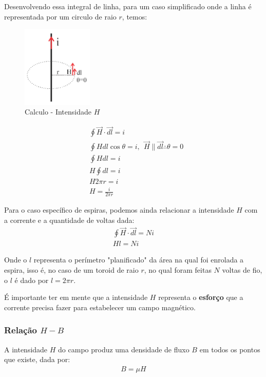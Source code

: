 \documentclass{article}
\newcommand{\n}{\nonumber \\ }
\begin{document}
Desenvolvendo essa integral de linha, para um caso simplificado onde a linha é representada por um circulo de raio $r$, temos:

\begin{figure}
    \centering
    \includegraphics[width=0.3\textwidth]{imgs/2023-08-15 11_04_26-1_CIRCUITOS_MAG.pdf - ET520 - Princípios de Conversão de Energia - Visual Studio.png}
    \caption{Calculo - Intensidade $H$}
\end{figure}

\begin{align}
    &\oint \vec H \cdot \vec{dl} = i \n
    &\oint  H dl \cos \theta = i , \ \  \vec H \parallel \vec{dl} \therefore \theta = 0 \n
    &\oint  H dl = i \n 
    &H \oint  dl = i \n 
    &H 2 \pi r = i \n 
    &H = \frac{i}{2 \pi r }
\end{align}

Para o caso específico de espiras, podemos ainda relacionar a intensidade $H$ com a corrente e a quantidade de voltas dada:
\begin{align}
    \oint \vec H \cdot \vec{dl} = Ni \n
    H l = Ni
    \label{eq:intensidade_espiras}
\end{align}

Onde o $l$ representa o perímetro "planificado" da área na qual foi enrolada a espira, isso é, no caso de um toroid de raio $r$, no qual foram feitas $N$ voltas de fio, o $l$ é dado por $l=2\pi r$.

É importante ter em mente que a intensidade $H$ representa o \textbf{esforço} que a corrente precisa fazer para estabelecer um campo magnético.

\subsubsection{Relação $H-B$}
A intensidade $H$ do campo produz uma densidade de fluxo $B$ em todos os pontos que existe, dada por: 
\begin{align}
    B = \mu H
\end{align}
\end{document}
